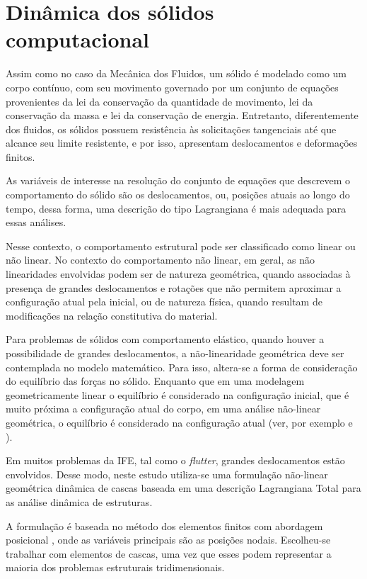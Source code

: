 \chapter[Dinâmica dos sólidos computacional]{Dinâmica dos sólidos computacional} \label{capitulo:Cap4}

Assim como no caso da Mecânica dos Fluidos, um sólido é modelado como um corpo contínuo, com seu movimento governado por um conjunto de equações provenientes da lei da conservação da quantidade de movimento, lei da conservação da massa e lei da conservação de energia. Entretanto, diferentemente dos fluidos, os sólidos possuem resistência às solicitações tangenciais até que alcance seu limite resistente, e por isso, apresentam deslocamentos e deformações finitos. 

As variáveis de interesse na resolução do conjunto de equações que descrevem o comportamento do sólido são os deslocamentos, ou, posições atuais ao longo do tempo, dessa forma, uma descrição do tipo Lagrangiana é mais adequada para essas análises.

Nesse contexto, o comportamento estrutural pode ser classificado como linear ou não linear. No contexto do comportamento não linear, em geral, as não linearidades envolvidas podem ser de natureza geométrica, quando associadas à presença de grandes deslocamentos e rotações que não permitem aproximar a configuração atual pela inicial, ou de natureza física, quando resultam de modificações na relação constitutiva do material.

Para problemas de sólidos com comportamento elástico, quando houver a possibilidade de grandes deslocamentos, a não-linearidade geométrica deve ser contemplada no modelo matemático. Para isso, altera-se a forma de consideração do equilíbrio das forças no sólido. Enquanto que em uma modelagem geometricamente linear o equilíbrio é considerado na configuração inicial, que é muito próxima a configuração atual do corpo, em uma análise não-linear geométrica, o equilíbrio é considerado na configuração atual (ver, por exemplo  e ).

Em muitos problemas da IFE, tal como o \textit{flutter}, grandes deslocamentos estão envolvidos. Desse modo, neste estudo utiliza-se uma formulação não-linear geométrica dinâmica de cascas baseada em uma descrição Lagrangiana Total para as análise dinâmica de estruturas. 

A formulação é baseada no método dos elementos finitos com abordagem posicional \cite{Coda:2003,Coda:2018}, onde as variáveis principais são as posições nodais. Escolheu-se trabalhar com elementos de cascas, uma vez que esses podem representar a maioria dos problemas estruturais tridimensionais. 

